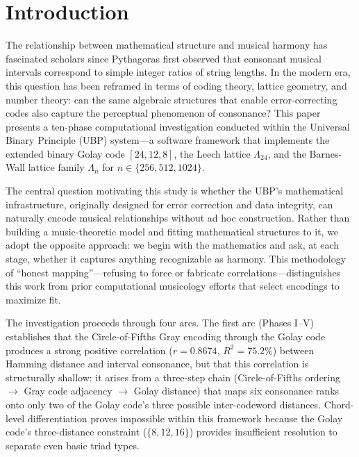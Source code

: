 \documentclass[11pt,a4paper]{article}
\theoremstyle{definition}
\begin{document}

\tableofcontents
\newpage

\section{Introduction}\label{sec:intro}

The relationship between mathematical structure and musical harmony has fascinated scholars since Pythagoras first observed that consonant musical intervals correspond to simple integer ratios of string lengths. In the modern era, this question has been reframed in terms of coding theory, lattice geometry, and number theory: can the same algebraic structures that enable error-correcting codes also capture the perceptual phenomenon of consonance? This paper presents a ten-phase computational investigation conducted within the Universal Binary Principle (UBP) system---a software framework that implements the extended binary Golay code $[24,12,8]$, the Leech lattice $\Lambda_{24}$, and the Barnes-Wall lattice family $\Lambda_n$ for $n \in \{256, 512, 1024\}$.

The central question motivating this study is whether the UBP's mathematical infrastructure, originally designed for error correction and data integrity, can naturally encode musical relationships without ad hoc construction. Rather than building a music-theoretic model and fitting mathematical structures to it, we adopt the opposite approach: we begin with the mathematics and ask, at each stage, whether it captures anything recognizable as harmony. This methodology of ``honest mapping''---refusing to force or fabricate correlations---distinguishes this work from prior computational musicology efforts that select encodings to maximize fit.

The investigation proceeds through four arcs. The first arc (Phases I--V) establishes that the Circle-of-Fifths Gray encoding through the Golay code produces a strong positive correlation ($r = 0.8674$, $R^2 = 75.2\%$) between Hamming distance and interval consonance, but that this correlation is structurally shallow: it arises from a three-step chain (Circle-of-Fifths ordering $\to$ Gray code adjacency $\to$ Golay distance) that maps six consonance ranks onto only two of the Golay code's three possible inter-codeword distances. Chord-level differentiation proves impossible within this framework because the Golay code's three-distance constraint ($\{8, 12, 16\}$) provides insufficient resolution to separate even basic triad types.
\end{document}
